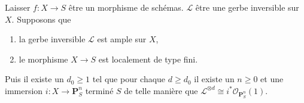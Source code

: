 \begin{lemma}

\label{lemma-quasi-projective-finite-type-over-S}

Laisser $f : X \to S$ être un morphisme de schémas. $\mathcal{L}$ être une gerbe inversible sur $X$. Supposons que

\begin{enumerate}

\item la gerbe inversible $\mathcal{L}$ est ample sur $X$,
\item le morphisme $X \to S$ est localement de type fini.

\end{enumerate}

Puis il existe un $d_0 \geq 1$ tel que pour chaque $d \geq d_0$
il existe un $n \geq 0$ et une immersion
$i : X \to \mathbf{P}^n_S$ terminé $S$ de telle manière que
$\mathcal{L}^{\otimes d} \cong i^*\mathcal{O}_{\mathbf{P}^n_S}(1)$.

\end{lemma}

